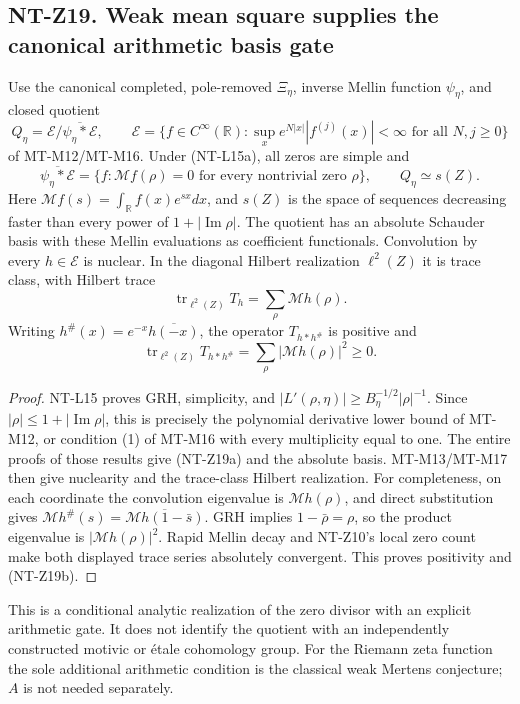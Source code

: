 \documentclass[11pt,a4paper]{article}
\begin{document}
\subsection*{NT-Z19. Weak mean square supplies the canonical arithmetic basis gate}
Use the canonical completed, pole-removed $\Xi_\eta$, inverse Mellin
function $\psi_\eta$, and closed quotient
\[
 Q_\eta=\mathcal E/\overline{\psi_\eta*\mathcal E},\qquad
 \mathcal E=\{f\in C^\infty(\mathbb R):
      \sup_x e^{N|x|}|f^{(j)}(x)|<\infty\text{ for all }N,j\ge0\}
\]
of MT-M12/MT-M16. Under (NT-L15a), all zeros are simple and
\[
 \overline{\psi_\eta*\mathcal E}
   =\{f:\mathcal Mf(\rho)=0\text{ for every nontrivial zero }\rho\},
 \qquad Q_\eta\simeq s(Z).
                                                        \tag{NT-Z19a}
\]
Here $\mathcal Mf(s)=\int_\mathbb Rf(x)e^{sx}dx$,
and $s(Z)$ is the space of sequences decreasing faster than every
power of $1+|\operatorname{Im}\rho|$. The quotient has an absolute
Schauder basis with these Mellin evaluations as coefficient functionals.
Convolution by every $h\in\mathcal E$ is nuclear. In the diagonal
Hilbert realization $\ell^2(Z)$ it is trace class, with Hilbert trace
\[
 \operatorname{tr}_{\ell^2(Z)}T_h=\sum_\rho\mathcal Mh(\rho).
\]
Writing $h^\#(x)=e^{-x}\overline{h(-x)}$, the operator
$T_{h*h^\#}$ is positive and
\[
 \operatorname{tr}_{\ell^2(Z)}T_{h*h^\#}
                     =\sum_\rho|\mathcal Mh(\rho)|^2\ge0.
                                                        \tag{NT-Z19b}
\]
\begin{proof}
NT-L15 proves GRH, simplicity, and
$|L'(\rho,\eta)|\ge B_\eta^{-1/2}|\rho|^{-1}$.
Since $|\rho|\le1+|\operatorname{Im}\rho|$, this is precisely the
polynomial derivative lower bound of MT-M12, or condition (1) of
MT-M16 with every multiplicity equal to one. The entire proofs of
those results give (NT-Z19a) and the absolute basis. MT-M13/MT-M17
then give nuclearity and the trace-class Hilbert realization. For
completeness, on each coordinate the convolution eigenvalue is
$\mathcal Mh(\rho)$, and direct substitution gives
$\mathcal M h^\#(s)=\overline{\mathcal Mh(1-\bar s)}$.
GRH implies $1-\bar\rho=\rho$, so the product eigenvalue is
$|\mathcal Mh(\rho)|^2$. Rapid Mellin decay and NT-Z10's local zero
count make both displayed trace series absolutely convergent. This
proves positivity and (NT-Z19b).
\end{proof}
This is a conditional analytic realization of the zero divisor with an
explicit arithmetic gate. It does not identify the quotient with an
independently constructed motivic or étale cohomology group.
For the Riemann zeta function the sole additional arithmetic condition
is the classical weak Mertens conjecture; $A$ is not needed separately.
\end{document}
